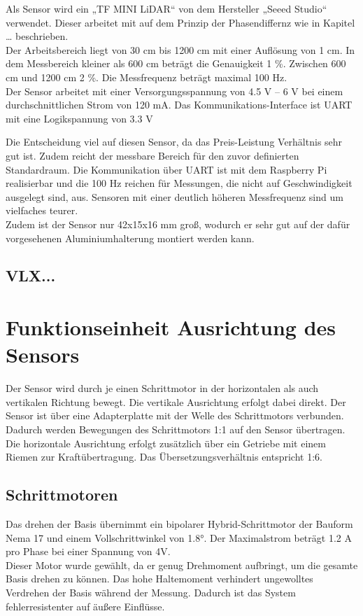 Als Sensor wird ein „TF MINI LiDAR“ von dem Hersteller „Seeed Studio“ verwendet. Dieser arbeitet mit auf dem Prinzip der Phasendiffernz wie in Kapitel … beschrieben.\\
Der Arbeitsbereich liegt von 30 cm bis 1200 cm mit einer Auflösung von 1 cm. In dem Messbereich kleiner als 600 cm beträgt die Genauigkeit 1 \%. Zwischen 600 cm und 1200 cm 2 \%. Die Messfrequenz beträgt maximal 100 Hz.\\
Der Sensor arbeitet mit einer Versorgungsspannung von 4.5 V – 6 V bei einem durchschnittlichen Strom von 120 mA. Das Kommunikations-Interface ist UART mit eine Logikspannung von 3.3 V

Die Entscheidung viel auf diesen Sensor, da das Preis-Leistung Verhältnis sehr gut ist. Zudem reicht der messbare Bereich für den zuvor definierten Standardraum. Die Kommunikation über UART ist mit dem Raspberry Pi realisierbar und die 100 Hz reichen für Messungen, die nicht auf Geschwindigkeit ausgelegt sind, aus. Sensoren mit einer deutlich höheren Messfrequenz sind um vielfaches teurer.\\
Zudem ist der Sensor nur 42x15x16 mm groß, wodurch er sehr gut auf der dafür vorgesehenen Aluminiumhalterung montiert werden kann. 


\subsection{VLX...}


\section{Funktionseinheit Ausrichtung des Sensors}

Der Sensor wird durch je einen Schrittmotor in der horizontalen als auch vertikalen Richtung bewegt. Die vertikale Ausrichtung erfolgt dabei direkt. Der Sensor ist über eine Adapterplatte mit der Welle des Schrittmotors verbunden. Dadurch werden Bewegungen des Schrittmotors 1:1 auf den Sensor übertragen.\\
Die horizontale Ausrichtung erfolgt zusätzlich über ein Getriebe mit einem Riemen zur Kraftübertragung. Das Übersetzungsverhältnis entspricht 1:6. 

\subsection{Schrittmotoren}
Das drehen der Basis übernimmt ein bipolarer Hybrid-Schrittmotor der Bauform Nema 17 und einem Vollschrittwinkel von 1.8°. Der Maximalstrom beträgt 1.2 A pro Phase bei einer Spannung von 4V.\\
Dieser Motor wurde gewählt, da er genug Drehmoment aufbringt, um die gesamte Basis drehen zu können. Das hohe Haltemoment verhindert ungewolltes Verdrehen der Basis während der Messung. Dadurch ist das System fehlerresistenter auf äußere Einflüsse. 


